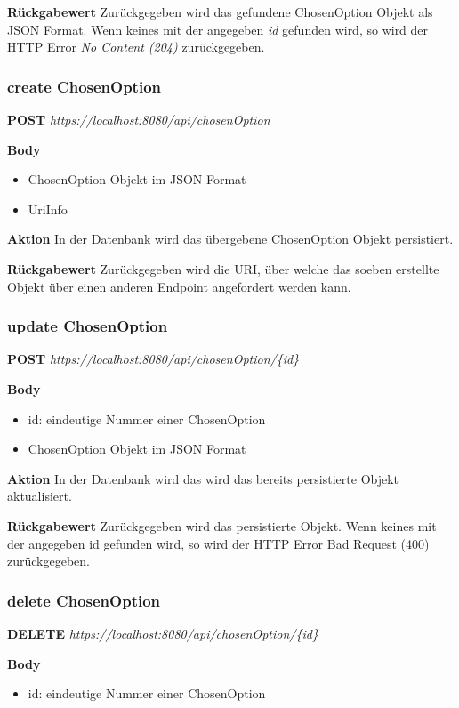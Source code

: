\textbf{Rückgabewert}
Zurückgegeben wird das gefundene ChosenOption Objekt als JSON Format. Wenn keines mit der angegeben \emph{id} gefunden wird, so wird der
HTTP Error \emph{No Content (204)} zurückgegeben.

\subsubsection{create ChosenOption}
\textbf{POST} \emph{https://localhost:8080/api/chosenOption}

\textbf{Body}
\begin{itemize}
    \item ChosenOption Objekt im JSON Format
    \item UriInfo
\end{itemize}

\textbf{Aktion}
In der Datenbank wird das übergebene ChosenOption Objekt persistiert.

\textbf{Rückgabewert}
Zurückgegeben wird die URI, über welche das soeben erstellte Objekt über einen anderen Endpoint angefordert werden kann.

\subsubsection{update ChosenOption}
\textbf{POST} \emph{https://localhost:8080/api/chosenOption/\{id\}}

\textbf{Body}
\begin{itemize}
    \item id: eindeutige Nummer einer ChosenOption
    \item ChosenOption Objekt im JSON Format
\end{itemize}

\textbf{Aktion}
In der Datenbank wird das wird das bereits persistierte Objekt aktualisiert.

\textbf{Rückgabewert}
Zurückgegeben wird das persistierte Objekt. Wenn keines mit der angegeben id gefunden wird, so wird der HTTP Error Bad Request
(400) zurückgegeben.

\subsubsection{delete ChosenOption}
\textbf{DELETE} \emph{https://localhost:8080/api/chosenOption/\{id\}}

\textbf{Body}
\begin{itemize}
    \item id: eindeutige Nummer einer ChosenOption
\end{itemize}


